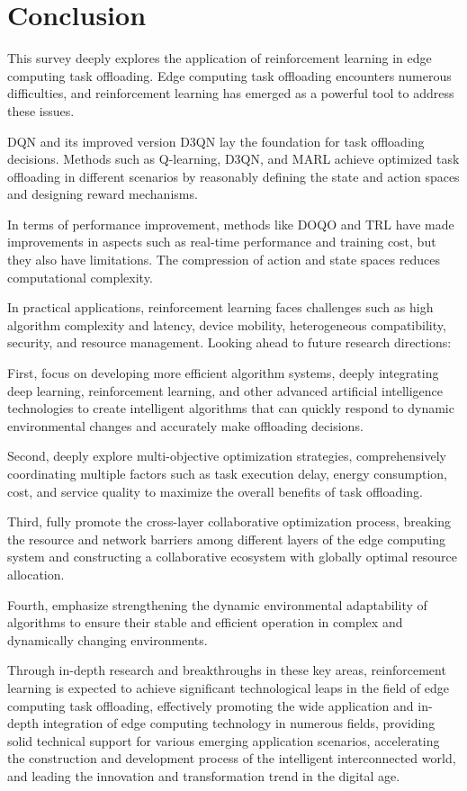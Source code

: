 \documentclass[journal]{IEEEtran}
\begin{document}
\section{Conclusion}

This survey deeply explores the application of reinforcement learning in edge computing task offloading. Edge computing task offloading encounters numerous difficulties, and reinforcement learning has emerged as a powerful tool to address these issues.

DQN and its improved version D3QN lay the foundation for task offloading decisions. Methods such as Q-learning, D3QN, and MARL achieve optimized task offloading in different scenarios by reasonably defining the state and action spaces and designing reward mechanisms.

In terms of performance improvement, methods like DOQO and TRL have made improvements in aspects such as real-time performance and training cost, but they also have limitations. The compression of action and state spaces reduces computational complexity.

In practical applications, reinforcement learning faces challenges such as high algorithm complexity and latency, device mobility, heterogeneous compatibility, security, and resource management.
Looking ahead to future research directions:

First, focus on developing more efficient algorithm systems, deeply integrating deep learning, reinforcement learning, and other advanced artificial intelligence technologies to create intelligent algorithms that can quickly respond to dynamic environmental changes and accurately make offloading decisions.

Second, deeply explore multi-objective optimization strategies, comprehensively coordinating multiple factors such as task execution delay, energy consumption, cost, and service quality to maximize the overall benefits of task offloading.

Third, fully promote the cross-layer collaborative optimization process, breaking the resource and network barriers among different layers of the edge computing system and constructing a collaborative ecosystem with globally optimal resource allocation.

Fourth, emphasize strengthening the dynamic environmental adaptability of algorithms to ensure their stable and efficient operation in complex and dynamically changing environments.

Through in-depth research and breakthroughs in these key areas, reinforcement learning is expected to achieve significant technological leaps in the field of edge computing task offloading, effectively promoting the wide application and in-depth integration of edge computing technology in numerous fields, providing solid technical support for various emerging application scenarios, accelerating the construction and development process of the intelligent interconnected world, and leading the innovation and transformation trend in the digital age.









\vfill
\end{document}
